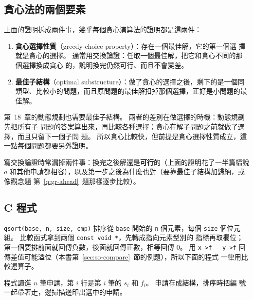 \subsection{貪心法的兩個要素}
\label{sec:gr-elements}

上面的證明拆成兩件事，幾乎每個貪心演算法的證明都是這兩件：

\begin{enumerate}
\item \textbf{貪心選擇性質}（greedy-choice property）：存在一個最佳解，它的第一個選
擇就是貪心的選擇。 通常用交換論證：任取一個最佳解，把它和貪心不同的那個選擇換成貪心
的，說明換完仍然可行、而且不會變差。
\item \textbf{最佳子結構}（optimal substructure）：做了貪心的選擇之後，剩下的是一個同
類型、比較小的問題，而且原問題的最佳解扣掉那個選擇，正好是小問題的最佳解。
\end{enumerate}

第~18~章的動態規劃也需要最佳子結構。 兩者的差別在做選擇的時機：動態規劃先把所有子
問題的答案算出來，再比較各種選擇；貪心在解子問題之前就做了選擇，而且只留下一個子問
題。 所以貪心比較快，但前提是貪心選擇性質成立，這一點每個問題都要另外證明。

寫交換論證時常漏掉兩件事：換完之後解還是\textbf{可行}的（上面的證明花了一半篇幅說
$a$ 和其他申請都相容），以及第一步之後為什麼也對（要靠最佳子結構加歸納，或像觀念題
第~\ref{q:gr-ahead}~題那樣逐步比較）。

\subsection{C 程式}

\begin{cbookrecap}[第~14~章結構、第~18~章 18.6 節]
\texttt{qsort(base, n, size, cmp)} 排序從 \texttt{base} 開始的 \texttt{n} 個元素，每個
\texttt{size} 個位元組。 比較函式拿到兩個 \texttt{const void *}，先轉成指向元素型別的
指標再取欄位；第一個要排前面就回傳負數，後面就回傳正數，相等回傳 $0$。 用
\texttt{x->f - y->f} 回傳差值可能溢位（本書第~\ref{sec:so-compare}~節的例題），所以下面的程式
一律用比較運算子。
\end{cbookrecap}

程式讀進 $n$ 筆申請，第 $i$ 行是第 $i$ 筆的 $s_i$ 和 $f_i$。 申請存成結構，排序時把編
號一起帶著走，邊掃描邊印出選中的申請。

